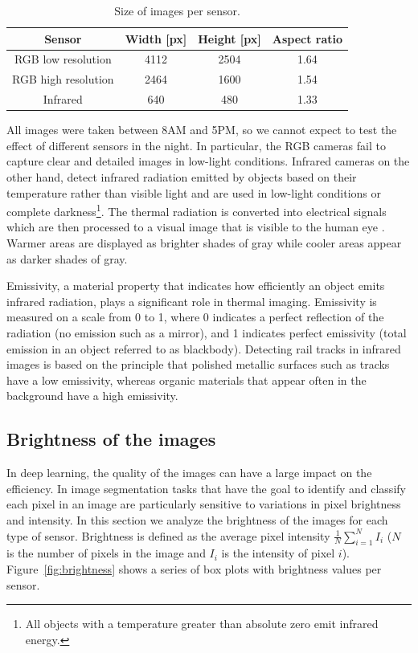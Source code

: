 \documentclass[Master,MDS,english]{BASE/twbook} %
\begin{document}
\begin{table}[H]
\begin{center}
\begin{tabular}{|c| c c c|} 
  \hline
 Sensor &	Width [px] &	Height [px] &	Aspect ratio \\
 \hline
RGB low resolution &	4112 &	2504 &	1.64 \\
 \hline
RGB high resolution &	2464 &	1600 &	1.54 \\
 \hline
Infrared	& 640 &	480 &	1.33 \\
 \hline
\end{tabular}
\caption{Size of images per sensor.}
\label{tab:1}
\end{center}
\end{table}


All images were taken between 8AM and 5PM, so we cannot expect to test the effect of different sensors in the night. In particular, the RGB cameras fail to capture clear and detailed images in low-light conditions. 
Infrared cameras on the other hand, detect infrared radiation emitted by objects based on their temperature rather than visible light and are used in low-light conditions or complete darkness\footnote{All objects with a temperature greater than absolute zero emit infrared energy.}. The thermal radiation is converted into electrical signals which are then processed to a visual image that is visible to the human eye \citep{CLARK200283}. Warmer areas are displayed as brighter shades of gray while cooler areas appear as darker shades of gray.

Emissivity, a material property that indicates how efficiently an object emits infrared radiation, plays a significant role in thermal imaging. Emissivity is measured on a scale from 0 to 1, where 0 indicates a perfect reflection of the radiation (no emission such as a mirror), and 1 indicates perfect emissivity (total emission in an object referred to as blackbody).  Detecting rail tracks in infrared images is based on the principle that polished metallic surfaces such as tracks have a low emissivity, whereas organic materials that appear often in the background have a high emissivity.  


\subsection{Brightness of the images}


In deep learning, the quality of the images can have a large impact on the efficiency. In image segmentation tasks that have the goal to identify and classify each pixel in an image are particularly sensitive to variations in pixel brightness and intensity.
In this section we analyze the brightness of the images for each type of sensor. Brightness is defined as the average pixel intensity $\frac{1}{N} \sum_{i=1}^{N} I_i $ ($N$ is the number of pixels in the image and $I_i$ is the intensity of pixel $i$). Figure~\ref{fig:brightness} shows a series of box plots with brightness values per sensor.
\end{document}
